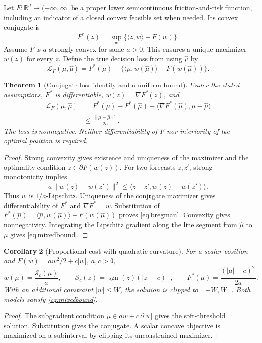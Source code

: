 \documentclass[11pt]{article}
\theoremstyle{plain}
\newtheorem{theorem}{Theorem}[section]
\newtheorem{corollary}[theorem]{Corollary}
\theoremstyle{definition}
\theoremstyle{remark}
\newcommand{\R}{\mathbb R}
\newcommand{\norm}[1]{\lVert#1\rVert}
\DeclareMathOperator{\sgn}{sgn}
\newcommand{\soft}{\mathcal S}
\begin{document}
Let \(F:\R^d\to(-\infty,\infty]\) be a proper lower semicontinuous
friction-and-risk function, including an indicator of a closed convex
feasible set when needed. Its convex conjugate is
\[
F^\ast(z)=\sup_w\{\langle z,w\rangle-F(w)\}.
\]
Assume \(F\) is \(a\)-strongly convex for some \(a>0\).
This ensures a unique maximizer \(w(z)\) for every \(z\).
Define the true decision loss from using \(\widehat\mu\) by
\[
\mathcal L_F(\mu,\widehat\mu)=
F^\ast(\mu)-\{\langle\mu,w(\widehat\mu)\rangle-F(w(\widehat\mu))\}.
\]

\begin{theorem}[Conjugate loss identity and a uniform bound]\label{thm:conjugate}
Under the stated assumptions, \(F^\ast\) is differentiable,
\(w(z)=\nabla F^\ast(z)\), and
\begin{align}
\mathcal L_F(\mu,\widehat\mu)
&=F^\ast(\mu)-F^\ast(\widehat\mu)
 -\langle\nabla F^\ast(\widehat\mu),\mu-\widehat\mu\rangle
\label{eq:bregman}\\
&\le\frac{\norm{\mu-\widehat\mu}^2}{2a}.
\label{eq:mixedbound}
\end{align}
The loss is nonnegative. Neither differentiability of \(F\) nor
interiority of the optimal position is required.
\end{theorem}
\begin{proof}
Strong convexity gives existence and uniqueness of the maximizer and
the optimality condition \(z\in\partial F(w(z))\).
For two forecasts \(z,z'\), strong monotonicity implies
\[
a\norm{w(z)-w(z')}^2
\le\langle z-z',w(z)-w(z')\rangle.
\]
Thus \(w\) is \(1/a\)-Lipschitz. Uniqueness of the conjugate maximizer
gives differentiability of \(F^\ast\) and \(\nabla F^\ast=w\).
Substitution of
\(F^\ast(\widehat\mu)=\langle\widehat\mu,w(\widehat\mu)\rangle
-F(w(\widehat\mu))\) proves \eqref{eq:bregman}.
Convexity gives nonnegativity. Integrating the Lipschitz gradient along
the line segment from \(\widehat\mu\) to \(\mu\) gives
\eqref{eq:mixedbound}.
\end{proof}

\begin{corollary}[Proportional cost with quadratic curvature]\label{cor:soft}
For a scalar position and \(F(w)=aw^2/2+c|w|\), \(a,c>0\),
\[
w(\mu)=\frac{\soft_c(\mu)}a,\qquad
\soft_c(z)=\sgn(z)(|z|-c)_+,\qquad
F^\ast(\mu)=\frac{(|\mu|-c)_+^2}{2a}.
\]
With an additional constraint \(|w|\le W\), the solution is clipped to
\([-W,W]\). Both models satisfy \eqref{eq:mixedbound}.
\end{corollary}
\begin{proof}
The subgradient condition \(\mu\in aw+c\,\partial|w|\) gives the
soft-threshold solution. Substitution gives the conjugate. A scalar
concave objective is maximized on a subinterval by clipping its
unconstrained maximizer.
\end{proof}
\end{document}
